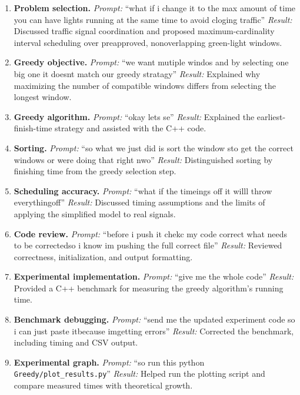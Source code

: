 \begin{enumerate}

\item \textbf{Problem selection.}
\emph{Prompt:} ``what if i change it to the max amount
of time you can have lights running at the same time
to avoid cloging traffic''
\emph{Result:} Discussed traffic signal coordination
and proposed maximum-cardinality interval scheduling
over preapproved, nonoverlapping green-light windows.

\item \textbf{Greedy objective.}
\emph{Prompt:} ``we want mutiple windos and by selecting
one big one it doesnt match our greedy stratagy''
\emph{Result:} Explained why maximizing the number of
compatible windows differs from selecting the longest
window.

\item \textbf{Greedy algorithm.}
\emph{Prompt:} ``okay lets se''
\emph{Result:} Explained the earliest-finish-time
strategy and assisted with the C++ code.

\item \textbf{Sorting.}
\emph{Prompt:} ``so what we just did is sort the window
sto get the correct windows or were doing that right
nwo''
\emph{Result:} Distinguished sorting by finishing time
from the greedy selection step.

\item \textbf{Scheduling accuracy.}
\emph{Prompt:} ``what if the timeings off it willl throw
everythingoff''
\emph{Result:} Discussed timing assumptions and the
limits of applying the simplified model to real
signals.

\item \textbf{Code review.}
\emph{Prompt:} ``before i push it chekc my code correct
what needs to be correctedso i know im pushing the full
correct file''
\emph{Result:} Reviewed correctness, initialization,
and output formatting.

\item \textbf{Experimental implementation.}
\emph{Prompt:} ``give me the whole code''
\emph{Result:} Provided a C++ benchmark for measuring
the greedy algorithm's running time.

\item \textbf{Benchmark debugging.}
\emph{Prompt:} ``send me the updated experiment code so
i can just paste itbecause imgetting errors''
\emph{Result:} Corrected the benchmark, including
timing and CSV output.

\item \textbf{Experimental graph.}
\emph{Prompt:} ``so run this python
\texttt{Greedy/plot\_results.py}''
\emph{Result:} Helped run the plotting script and
compare measured times with theoretical growth.


\end{enumerate}
